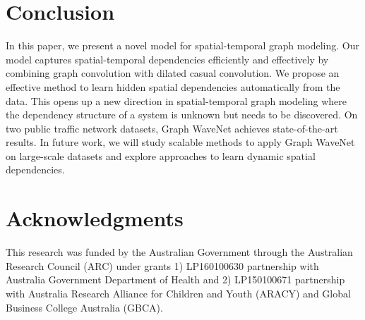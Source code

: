 \section{Conclusion}
In this paper, we present a novel model for spatial-temporal graph modeling. Our model captures spatial-temporal dependencies efficiently and effectively by combining graph convolution with dilated casual convolution. We propose an effective method to learn hidden spatial dependencies automatically from the data. This opens up a new direction in spatial-temporal graph modeling where the dependency structure of a system is unknown but needs to be discovered. On two public traffic network datasets, Graph WaveNet achieves state-of-the-art results. In future work, we will study scalable methods to apply Graph WaveNet on large-scale datasets and explore approaches to learn dynamic spatial dependencies. 
























\section*{Acknowledgments}
 This research was funded by the Australian Government through the Australian Research Council (ARC) under grants 1) LP160100630 partnership with Australia Government Department of Health and 2) LP150100671 partnership with Australia Research Alliance for Children and Youth (ARACY) and Global Business College Australia (GBCA). %

